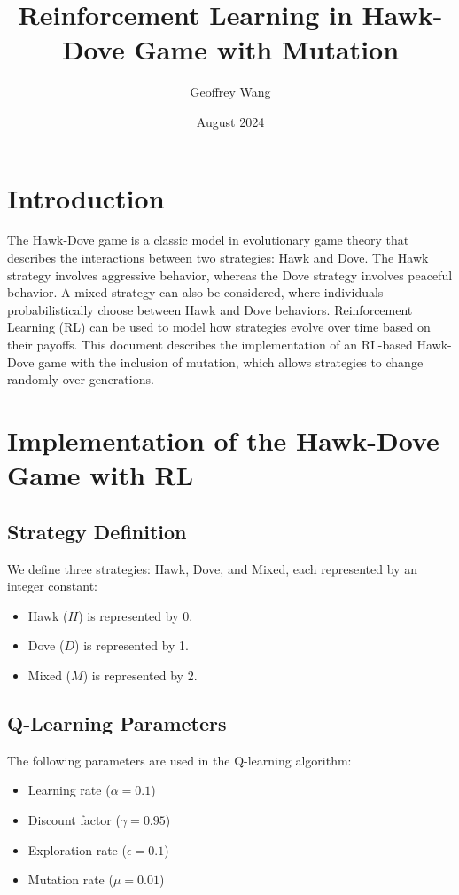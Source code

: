 \documentclass{article}
\title{Reinforcement Learning in Hawk-Dove Game with Mutation}
\author{Geoffrey Wang}
\date{August 2024}
\begin{document}
\maketitle

\section{Introduction}
The Hawk-Dove game is a classic model in evolutionary game theory that describes the interactions between two strategies: Hawk and Dove. The Hawk strategy involves aggressive behavior, whereas the Dove strategy involves peaceful behavior. A mixed strategy can also be considered, where individuals probabilistically choose between Hawk and Dove behaviors. Reinforcement Learning (RL) can be used to model how strategies evolve over time based on their payoffs. This document describes the implementation of an RL-based Hawk-Dove game with the inclusion of mutation, which allows strategies to change randomly over generations.

\section{Implementation of the Hawk-Dove Game with RL}

\subsection{Strategy Definition}
We define three strategies: Hawk, Dove, and Mixed, each represented by an integer constant:
\begin{itemize}
    \item Hawk ($H$) is represented by 0.
    \item Dove ($D$) is represented by 1.
    \item Mixed ($M$) is represented by 2.
\end{itemize}

\subsection{Q-Learning Parameters}
The following parameters are used in the Q-learning algorithm:
\begin{itemize}
    \item Learning rate ($\alpha = 0.1$)
    \item Discount factor ($\gamma = 0.95$)
    \item Exploration rate ($\epsilon = 0.1$)
    \item Mutation rate ($\mu = 0.01$)
\end{itemize}
\end{document}
